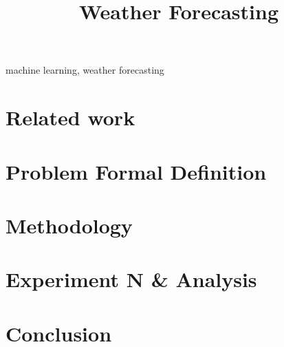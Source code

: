 



\title{Weather Forecasting}
\author{
    \and
    \and
    \and
}

\maketitle

\begin{abstract}
\end{abstract}

\begin{IEEEkeywords}
machine learning, weather forecasting
\end{IEEEkeywords}




\section{Related work}



\section{Problem Formal Definition}

\section{Methodology}

\section{Experiment N \& Analysis}


\section{Conclusion}





\appendix
%

